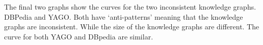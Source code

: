 \documentclass[11pt,letterpaper ,oneside ]{book}
\begin{document}
\begin{figure}[!t]
\end{figure}

The final two graphs show the curves for the two inconsistent knowledge graphs. DBPedia and YAGO. Both have `anti-patterns' meaning that the knowledge graphs are inconsistent. While the size of the knowledge graphs are different. The curve for both YAGO and DBpedia are similar. 
\end{document}
